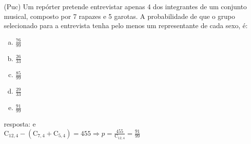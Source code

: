 \begin{ex}
 	(Puc) Um repórter pretende entrevistar apenas 4 dos integrantes de um conjunto musical, composto por 7 rapazes e 5 garotas. A probabilidade de que o grupo selecionado para a entrevista tenha pelo menos um representante de cada sexo, é:
    \begin{enumerate}[(a)]
    \item $\frac{76}{99}$
    \item $\frac{26}{33}$
    \item $\frac{85}{99}$
    \item $\frac{29}{33}$
    \item $\frac{91}{99}$
    \end{enumerate}
      \begin{sol}
        resposta: e \\
        $\mathrm{C}_{{12},4}-(\mathrm{C}_{7,4}+\mathrm{C}_{5,4})=455 \Longrightarrow p=\frac{455}{\mathrm{C}_{{12},4}}=\frac{91}{99}$
      \end{sol}
\end{ex}